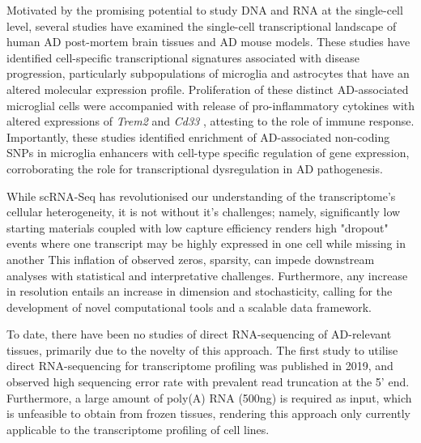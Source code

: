 Motivated by the promising potential to study DNA and RNA at the single-cell level, several studies have examined the single-cell transcriptional landscape of human AD post-mortem brain tissues\cite{Mathys2019,Nott2019,Thrupp2020,Olah2020,Leng2021,Young2021} and AD mouse models\cite{Keren-Shaul2017,Mathys2017}. These studies have identified cell-specific transcriptional signatures associated with disease progression, particularly subpopulations of microglia and astrocytes that have an altered molecular expression profile. Proliferation of these distinct AD-associated microglial cells were accompanied with release of pro-inflammatory cytokines\cite{Mathys2017} with altered expressions of \textit{Trem2} and \textit{Cd33} \cite{Mathys2019,Frigerio2019}, attesting to the role of immune response. Importantly, these studies identified enrichment of AD-associated non-coding SNPs in microglia enhancers with cell-type specific regulation of gene expression\cite{Tansey2018,Nott2019,Young2021,Novikova2021}, corroborating the role for transcriptional dysregulation in AD pathogenesis.   

While scRNA-Seq has revolutionised our understanding of the transcriptome's cellular heterogeneity, it is not without it's challenges; namely, significantly low starting materials coupled with low capture efficiency renders high "dropout" events where one transcript may be highly expressed in one cell while missing in another\cite{Lahnemann2020,Adil2021} This inflation of observed zeros, sparsity, can impede downstream analyses with statistical and interpretative challenges\cite{Adil2021}. Furthermore, any increase in resolution entails an increase in dimension and stochasticity, calling for the development of novel computational tools and a scalable data framework\cite{Lahnemann2020}. 

\newpage
{}
To date, there have been no studies of direct RNA-sequencing of AD-relevant tissues, primarily due to the novelty of this approach. The first study to utilise direct RNA-sequencing for transcriptome profiling was published in 2019, and observed high sequencing error rate with prevalent read truncation at the 5' end\cite{Workman2019a}. Furthermore, a large amount of poly(A) RNA (500ng) is required as input, which is unfeasible to obtain from frozen tissues, rendering this approach only currently applicable to the transcriptome profiling of cell lines.      
  

